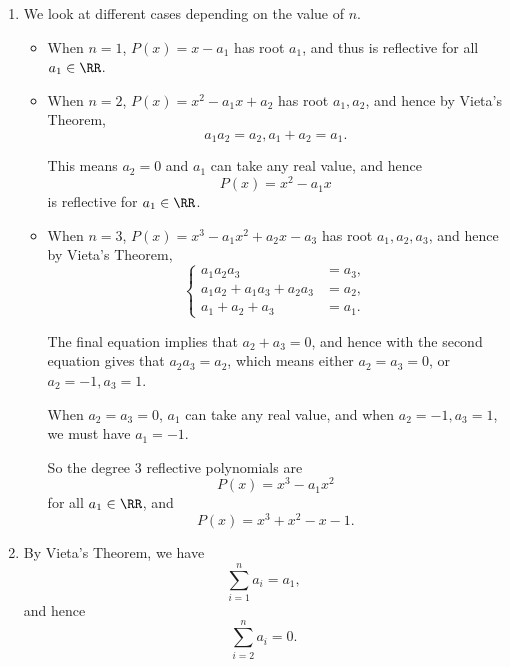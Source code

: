\Question{\currfilebase}
\begin{enumerate}
    \item We look at different cases depending on the value of \(n\).
          \begin{itemize}
              \item When \(n = 1\), \(P(x) = x - a_1\) has root \(a_1\), and thus is reflective for all \(a_1 \in \RR\).
              \item When \(n = 2\), \(P(x) = x^2 - a_1 x + a_2\) has root \(a_1, a_2\), and hence by Vieta's Theorem,
                    \[
                        a_1 a_2 = a_2, a_1 + a_2 = a_1.
                    \]

                    This means \(a_2 = 0\) and \(a_1\) can take any real value, and hence
                    \[
                        P(x) = x^2 - a_1 x
                    \]
                    is reflective for \(a_1 \in \RR\).
              \item When \(n = 3\), \(P(x) = x^3 - a_1 x^2 + a_2 x - a_3\) has root \(a_1, a_2, a_3\), and hence by Vieta's Theorem,
                    \[
                        \left\{
                        \begin{aligned}
                            a_1 a_2 a_3                 & = a_3, \\
                            a_1 a_2 + a_1 a_3 + a_2 a_3 & = a_2, \\
                            a_1 + a_2 + a_3             & = a_1.
                        \end{aligned}
                        \right.
                    \]

                    The final equation implies that \(a_2 + a_3 = 0\), and hence with the second equation gives that \(a_2 a_3 = a_2\), which means either \(a_2 = a_3 = 0\), or \(a_2 = -1, a_3 = 1\).

                    When \(a_2 = a_3 = 0\), \(a_1\) can take any real value, and when \(a_2 = -1, a_3 = 1\), we must have \(a_1 = -1\).

                    So the degree \(3\) reflective polynomials are
                    \[
                        P(x) = x^3 - a_1 x^2
                    \]
                    for all \(a_1 \in \RR\), and
                    \[
                        P(x) = x^3 + x^2 - x - 1.
                    \]
          \end{itemize}

    \item By Vieta's Theorem, we have
          \[
              \sum_{i = 1}^{n} a_i = a_1,
          \]
          and hence
          \[
              \sum_{i = 2}^{n} a_i = 0.
          \]


\end{enumerate}
